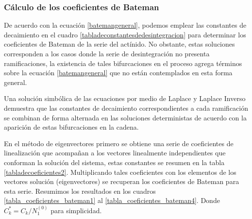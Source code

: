 \subsubsection{Cálculo de los coeficientes de Bateman}

De acuerdo con la ecuación \ref{batemangeneral}, podemos emplear las constantes de decaimiento en el cuadro \ref{tabladeconstantesdedesintegracion} para determinar los coeficientes de Bateman de la serie del actínido. No obstante, estas soluciones corresponden a los casos donde la serie de desintegración no presenta ramificaciones, la existencia de tales bifurcaciones en el proceso agrega términos sobre la ecuación \ref{batemangeneral} que no están contemplados en esta forma general.

Una solución simbólica de las ecuaciones por medio de Laplace y Laplace Inverso demuestra que las constantes de decaimiento correspondientes a cada ramificación se combinan de forma alternada en las soluciones deterministas de acuerdo con la aparición de estas bifurcaciones en la cadena.

En el método de eigenvectores primero se obtiene una serie de coeficientes de linealización que acompañan a los vectores linealmente independientes que conforman la solución del sistema, estas constantes se resumen en la tabla \ref{tabladecoeficientes2}. Multiplicando tales coeficientes con los elementos de los vectores solución (eigenvectores) se recuperan los coeficientes de Bateman para esta serie. Resumimos los resultados en los cuadros \ref{tabla_coeficientes_bateman1} al \ref{tabla_coeficientes_bateman4}. Donde $C_k^*=C_k/N_1^{(0)}$ para simplicidad. 

